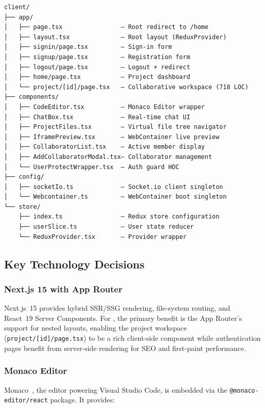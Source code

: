 \begin{verbatim}
client/
├── app/
│   ├── page.tsx                — Root redirect to /home
│   ├── layout.tsx              — Root layout (ReduxProvider)
│   ├── signin/page.tsx         — Sign-in form
│   ├── signup/page.tsx         — Registration form
│   ├── logout/page.tsx         — Logout + redirect
│   ├── home/page.tsx           — Project dashboard
│   └── project/[id]/page.tsx   — Collaborative workspace (718 LOC)
├── components/
│   ├── CodeEditor.tsx          — Monaco Editor wrapper
│   ├── ChatBox.tsx             — Real-time chat UI
│   ├── ProjectFiles.tsx        — Virtual file tree navigator
│   ├── IframePreview.tsx       — WebContainer live preview
│   ├── CollaboratorList.tsx    — Active member display
│   ├── AddCollaboratorModal.tsx— Collaborator management
│   └── UserProtectWrapper.tsx  — Auth guard HOC
├── config/
│   ├── socketIo.ts             — Socket.io client singleton
│   └── Webcontainer.ts         — WebContainer boot singleton
└── store/
    ├── index.ts                — Redux store configuration
    ├── userSlice.ts            — User state reducer
    └── ReduxProvider.tsx       — Provider wrapper
\end{verbatim}

\subsection{Key Technology Decisions}

\subsubsection{Next.js 15 with App Router}

Next.js~15 provides hybrid SSR/SSG rendering, file-system routing, and
React~19 Server Components. For \echoray{}, the primary benefit is the
App Router's support for nested layouts, enabling the project workspace
(\texttt{project/[id]/page.tsx}) to be a rich client-side component while
authentication pages benefit from server-side rendering for SEO and
first-paint performance.

\subsubsection{Monaco Editor}

Monaco~\cite{monacoeditor2023}, the editor powering Visual Studio Code, is
embedded via the \texttt{@monaco-editor/react} package. It provides:

